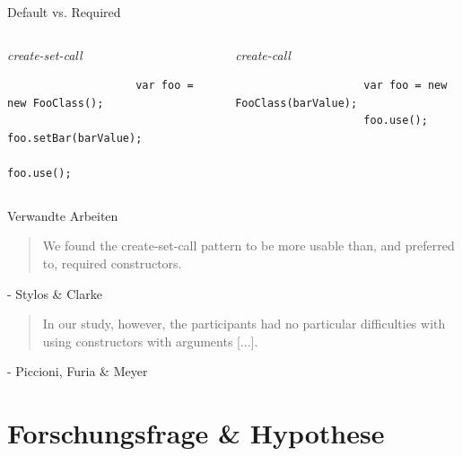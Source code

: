 \documentclass[10pt]{beamer}
\begin{document}
	\begin{frame}[fragile]{Default vs. Required}
		\begin{columns}[T,onlytextwidth]
			
			\begin{column}{0.45\textwidth}
				\begin{center}\textit{create-set-call}\end{center}
				\begin{verbatim}
					var foo = new FooClass();
					foo.setBar(barValue);
					foo.use();
				\end{verbatim}
			\end{column}
			\vrule{}
			\begin{column}{0.02\textwidth}
			\end{column}
			\begin{column}{0.53\textwidth}
				\begin{center}\textit{create-call}\end{center}
				\begin{verbatim}
					var foo = new FooClass(barValue);
					foo.use();
				\end{verbatim}
			\end{column}
			
		\end{columns}
	\end{frame}

	\begin{frame}{Verwandte Arbeiten}
		\begin{quote}
			We found the create-set-call pattern to be more
			usable than, and preferred to, required constructors.
		\end{quote}
		\hfill - Stylos \& Clarke~\cite{Stylos:2007:UIR:1248820.1248828}\\
		\vspace{\baselineskip}
		\vspace{\baselineskip}
		\begin{quote}
			In our study, however, the participants had no particular
			difficulties with using constructors with arguments [...]. 
		\end{quote}
		\hfill - Piccioni, Furia \& Meyer~\cite{6681333}
	
	
	\end{frame}

\section{Forschungsfrage \& Hypothese}
\end{document}
